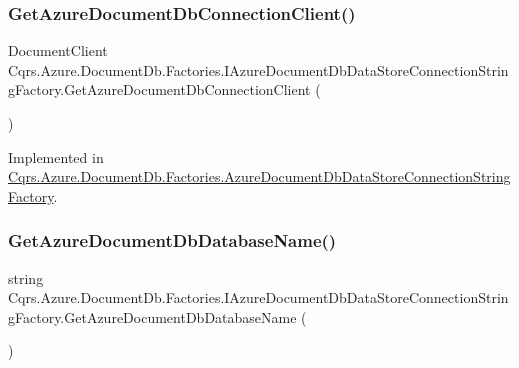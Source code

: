 \subsubsection{\texorpdfstring{Get\+Azure\+Document\+Db\+Connection\+Client()}{GetAzureDocumentDbConnectionClient()}}
{\footnotesize\ttfamily Document\+Client Cqrs.\+Azure.\+Document\+Db.\+Factories.\+I\+Azure\+Document\+Db\+Data\+Store\+Connection\+String\+Factory.\+Get\+Azure\+Document\+Db\+Connection\+Client (\begin{DoxyParamCaption}{ }\end{DoxyParamCaption})}



Implemented in \hyperlink{classCqrs_1_1Azure_1_1DocumentDb_1_1Factories_1_1AzureDocumentDbDataStoreConnectionStringFactory_a0525c318c3930076e08ed83f9829ab2c}{Cqrs.\+Azure.\+Document\+Db.\+Factories.\+Azure\+Document\+Db\+Data\+Store\+Connection\+String\+Factory}.

\mbox{\label{interfaceCqrs_1_1Azure_1_1DocumentDb_1_1Factories_1_1IAzureDocumentDbDataStoreConnectionStringFactory_aa5e3d0920e86a97aef18f4f215ce4f88}} 
\subsubsection{\texorpdfstring{Get\+Azure\+Document\+Db\+Database\+Name()}{GetAzureDocumentDbDatabaseName()}}
{\footnotesize\ttfamily string Cqrs.\+Azure.\+Document\+Db.\+Factories.\+I\+Azure\+Document\+Db\+Data\+Store\+Connection\+String\+Factory.\+Get\+Azure\+Document\+Db\+Database\+Name (\begin{DoxyParamCaption}{ }\end{DoxyParamCaption})}



